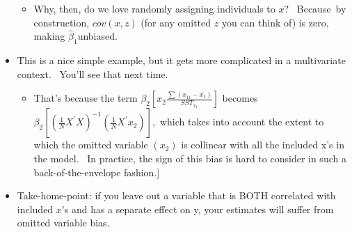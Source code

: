 \documentclass[11pt]{article}
\begin{document}
\begin{itemize}
\begin{itemize}
\item Why, then, do we love randomly assigning individuals to $x$? \
Because\ by construction, $cov(x,z)$ (for any omitted $z$ you can think of)
is zero, making $\widehat{\beta }_{1}$unbiased.
\end{itemize}

\item This is a nice simple example, but it gets more complicated in a
multivariate context. \ You'll see that next time.

\begin{itemize}
\item \lbrack That's because the term $\beta _{2}\left[ x_{2}\frac{\sum
\left( x_{1i}-\overline{x_{1}}\right) }{SST_{x_{1}}}\right] $ becomes $\beta
_{2}\left[ \left( \frac{1}{N}X^{\prime }X\right) ^{-1}\left( \frac{1}{N}%
X^{\prime }x_{2}\right) \right] ,$ which takes into account the extent to
which the omitted variable $\left( x_{2}\right) $ is collinear with all the
included x's in the model. \ In practice, the sign of this bias is hard to
consider in such a back-of-the-envelope fashion.]
\end{itemize}

\item Take-home-point: if you leave out a variable that is BOTH correlated
with included $x$'s and has a separate effect on y, your estimates will
suffer from omitted variable bias.
\end{itemize}
\end{document}
